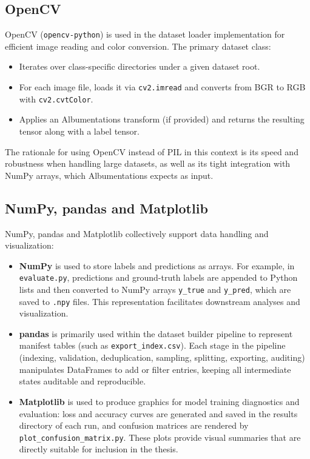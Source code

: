 \subsection{OpenCV}

OpenCV (\texttt{opencv-python}) is used in the dataset loader implementation for efficient image reading and color conversion. The primary dataset class:
\begin{itemize}
  \item Iterates over class-specific directories under a given dataset root.
  \item For each image file, loads it via \texttt{cv2.imread} and converts from BGR to RGB with \texttt{cv2.cvtColor}.
  \item Applies an Albumentations transform (if provided) and returns the resulting tensor along with a label tensor.
\end{itemize}

The rationale for using OpenCV instead of PIL in this context is its speed and robustness when handling large datasets, as well as its tight integration with NumPy arrays, which Albumentations expects as input.

\subsection{NumPy, pandas and Matplotlib}

NumPy, pandas and Matplotlib collectively support data handling and visualization:
\begin{itemize}
  \item \textbf{NumPy} is used to store labels and predictions as arrays. For example, in \texttt{evaluate.py}, predictions and ground-truth labels are appended to Python lists and then converted to NumPy arrays \texttt{y\_true} and \texttt{y\_pred}, which are saved to \texttt{.npy} files. This representation facilitates downstream analyses and visualization.
  \item \textbf{pandas} is primarily used within the dataset builder pipeline to represent manifest tables (such as \texttt{export\_index.csv}). Each stage in the pipeline (indexing, validation, deduplication, sampling, splitting, exporting, auditing) manipulates DataFrames to add or filter entries, keeping all intermediate states auditable and reproducible.
  \item \textbf{Matplotlib} is used to produce graphics for model training diagnostics and evaluation: loss and accuracy curves are generated and saved in the results directory of each run, and confusion matrices are rendered by \texttt{plot\_confusion\_matrix.py}. These plots provide visual summaries that are directly suitable for inclusion in the thesis.
\end{itemize}

